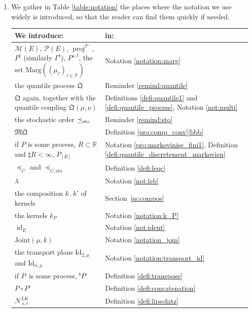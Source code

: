 \documentclass[JEP,XML,SOM,Unicode,NoEqCountersInSection,NoFloatCountersInSection,published]{cedram}
\newcommand{\ldot}{\mathbin{.}}
\theoremstyle{plain}
\theoremstyle{definition}
\newcommand{\id}{\mathrm{Id}}
\newcommand{\join}{\mathrm{Joint}}
\newcommand{\como}{\mathfrak{Q}}
\newcommand{\mq}{\mathfrak{MQ}}
\newcommand{\ML}{\mathrm{LK}}
\newcommand{\idk}{\operatorname{id}}
\newcommand{\Tt}{{\mathcal T}}
\let\mb\relax
\let\mn\relax
\newcommand{\trans}{{}^{\mathrm{t}}\mkern-1mu}
\newcommand{\la}{\lambda}
\newcommand{\p}{\mathcal{P}}
\newcommand{\m}{\mathcal{M}}
\newcommand{\ma}{\mathrm{Marg}}
\newcommand{\R}{\mathbb{R}}
\newcommand{\sto}{\mathrm{sto}}
\newcommand{\leqc}{\preceq_{C}}
\newcommand{\leqcs}{\preceq_{C,\sto}}
\newcommand{\leqs}{\preceq_{\text{\rm sto}}}
\newcommand{\pr}{\operatorname{proj}}
\begin{document}
\label{subsec:notation}
\begin{enumerate}
\item
We gather in Table \ref{table:notation} the places where the notation we use widely is introduced, so that the reader can find them quickly if needed.

\begin{table}[htb]\renewcommand{\arraystretch}{1.2}
\mb\scriptsize\hspace*{\fill}\begin{tabular}{|p{}|l|}\hline
We introduce: &in:\\\hline
$\m(E)$, $\p(E)$, $\pr^{\Tt'}$, $P^t$ (similarly $\Gamma^t$), $P^{s,t}$, the set $\ma((\mu_\tau)_{\tau\in\Tt})$ & Notation \ref{notation:marg}\\\hline
the quantile process $\como$ & Reminder \ref{remind:quantile}\\\hline
$\como$ again, together with the quantile coupling $\como(\mu,\nu)$ & Definitions \ref{defi:quantile1} and \ref{defi:quantile_process}, Notation \ref{not:multi}\\\hline
the stochastic order $\leqs$ & Reminder \ref{remind:sto}\\\hline
$\mq$ & Definition \ref{pro:comp_conv}\eqref{bbb}\\\hline
if \mn$P$ is some process, $R\subset\R$ and $\sharp R<\infty$\mb, $P_{[R]}$ & Notation \ref{pro:markovinise_fini1}, Definition \ref{defi:quantile_discretement_markovien}\\\hline
$\leqc$ and $\leqcs$ & Definition \ref{defi:leqc}\\\hline
$\la$ & Notation \ref{not:leb}\\\hline
the composition $k\ldot k'$ of kernels & Section~\ref{ss:compos}\\\hline
the kernels $k_P$ & Notation \ref{notation:k_P}\\\hline
$\idk_E$ & Notation \ref{not:ident}\\\hline
$\join(\mu,k)$ & Notation \ref{notation_join}\\\hline
the transport plans $\id_{2,\mu}$ and $\id_{n,\mu}$ & Notation \ref{notation:transport_id}\\\hline
if \mn$P$\mb\ is some process, $\trans P$ & Definition \ref{defi:transpose}\\\hline
$P\circ P'$ & Definition \ref{defi:concatenation}\\\hline
$\mathcal{N}^\ML_{s,t}$ & Definition \ref{defi:lipschitz}\\\hline

\end{tabular}
\end{table}
\end{enumerate}
\end{document}
